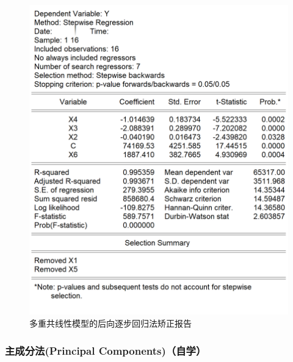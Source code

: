 \documentclass[12pt,(landscape,a4paper),(portrait,a4paper)]{article}
\begin{document}
\begin{figure}

{\centering \includegraphics[width=8in]{picture/lab5-multilinearity/5-medel-adj-step-full-report} 

}

\caption{多重共线性模型的后向逐步回归法矫正报告}\label{fig:fig-adj-step-report}
\end{figure}

\hypertarget{principal-components}{%
\subsubsection{主成分法(Principal
Components)（自学）}\label{principal-components}}
\end{document}
